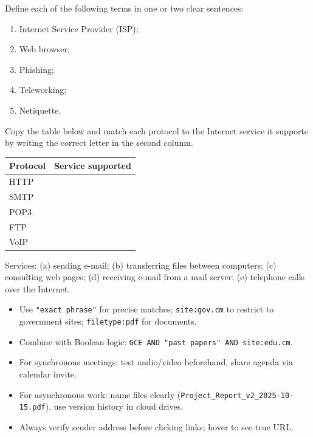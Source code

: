 \documentclass[11pt]{article}
\newcounter{popsec}
\newcounter{popsub}
\newcommand{\courssub}[1]{%
  \stepcounter{popsub}%
  \par\vspace{9pt}\noindent{\popxbold\fontsize{11.5}{13}\selectfont\color{popink}{\color{poporange}\thepopsec.\thepopsub}\hspace{6pt}#1}\par\nopagebreak\vspace{4pt}
}
\begin{document}
\begin{exercice}[Definitions]
Define each of the following terms in one or two clear sentences:
\begin{enumerate}
\item Internet Service Provider (ISP);
\item Web browser;
\item Phishing;
\item Teleworking;
\item Netiquette.
\end{enumerate}
\end{exercice}

\begin{exercice}
Copy the table below and match each protocol to the Internet service it supports by writing the correct letter in the second column.
\begin{center}
\begin{tabularx}{\linewidth}{|l|X|}\hline
\rowcolor{popblueL} \textbf{Protocol} & \textbf{Service supported} \\ \hline
HTTP & \hspace{4cm} \\ \hline
SMTP & \\ \hline
POP3 & \\ \hline
FTP & \\ \hline
VoIP & \\ \hline
\end{tabularx}
\end{center}
Services: (a) sending e-mail; (b) transferring files between computers; (c) consulting web pages; (d) receiving e-mail from a mail server; (e) telephone calls over the Internet.
\end{exercice}

\courssub{I practise}

\begin{aretenir}
\begin{itemize}
\item Use \texttt{"exact phrase"} for precise matches; \texttt{site:gov.cm} to restrict to government sites; \texttt{filetype:pdf} for documents.
\item Combine with Boolean logic: \texttt{GCE AND "past papers" AND site:edu.cm}.
\item For synchronous meetings: test audio/video beforehand, share agenda via calendar invite.
\item For asynchronous work: name files clearly (\texttt{Project\_Report\_v2\_2025-10-15.pdf}), use version history in cloud drives.
\item Always verify sender address before clicking links; hover to see true URL.
\end{itemize}
\end{aretenir}
\end{document}
